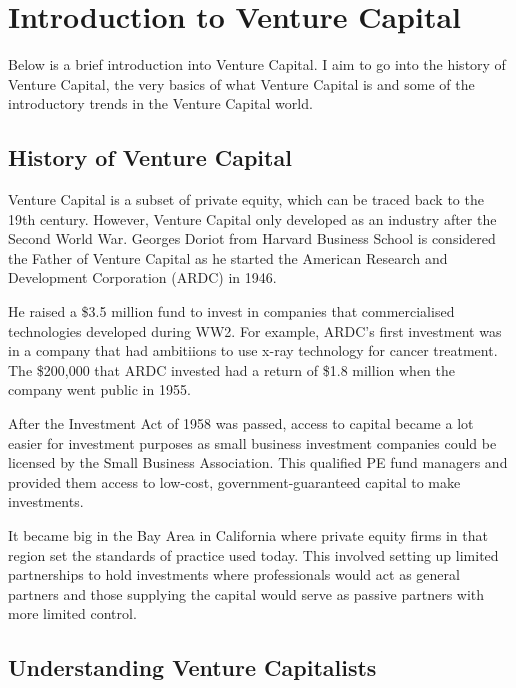 \documentclass[a4paper]{article}
\begin{document}
{\newpage
\pagestyle{empty}
\tableofcontents

\newpage
\pagestyle{fancy}

\section{Introduction to Venture Capital}
Below is a brief introduction into Venture Capital. I aim to go into the history of Venture Capital, the very basics of what Venture Capital is and some of the introductory trends in the Venture Capital world.

\subsection{History of Venture Capital}
Venture Capital is a subset of private equity, which can be traced back to the 19th century. However, Venture Capital only developed as an industry after the Second World War. Georges Doriot from Harvard Business School is considered the Father of Venture Capital as he started the American Research and Development Corporation (ARDC) in 1946.

\vspace{5pt}
\noindent He raised a \$3.5 million fund to invest in companies that commercialised technologies developed during WW2. For example, ARDC's first investment was in a company that had ambitiions to use x-ray technology for cancer treatment. The \$200,000 that ARDC invested had a return of \$1.8 million when the company went public in 1955.

\vspace{5pt}
\noindent After the Investment Act of 1958 was passed, access to capital became a lot easier for investment purposes as small business investment companies could be licensed by the Small Business Association. This qualified PE fund managers and provided them access to low-cost, government-guaranteed capital to make investments.

\vspace{5pt}
\noindent It became big in the Bay Area in California where private equity firms in that region set the standards of practice used today. This involved setting up limited partnerships to hold investments where professionals would act as general partners and those supplying the capital would serve as passive partners with more limited control.

\subsection{Understanding Venture Capitalists}

}
\end{document}
